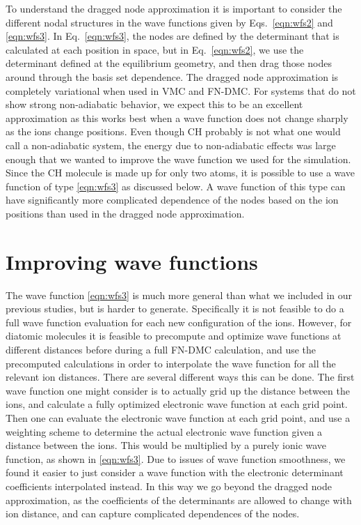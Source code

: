 \documentclass[aip,jcp,numerical,reprint]{revtex4-1}
\begin{document}
To understand the dragged node approximation  it is important to consider the different nodal structures in the wave functions given by Eqs.~\eqref{eqn:wfs2} and \eqref{eqn:wfs3}.  In Eq.~\eqref{eqn:wfs3}, the nodes are defined by the determinant that is calculated at each position in space, but in Eq.~\eqref{eqn:wfs2}, we use the determinant defined at the equilibrium geometry, and then drag those nodes around through the basis set dependence.   The dragged node approximation is completely variational when used in VMC and FN-DMC.  
For systems that do not show strong non-adiabatic behavior, we expect this to be an excellent approximation as this works best when a wave function does not change sharply as the ions change positions.   Even though CH probably is not what one would call a non-adiabatic system, the energy due to non-adiabatic effects was large enough that we wanted to improve the wave function we used for the simulation.    Since the CH molecule is made up for only two atoms, it is possible to use a wave function of type \eqref{eqn:wfs3} as discussed below.   A wave function of this type can have significantly more complicated dependence of the nodes based on the ion positions than used in the dragged node approximation.

\section{Improving wave functions}

The wave function \eqref{eqn:wfs3} is much more general than what we included in our previous studies, but is harder to generate.  Specifically it is not feasible to do a full wave function evaluation for each new configuration of the ions.  However, for diatomic molecules it is feasible to precompute and optimize wave functions at different distances before during a full FN-DMC calculation, and use the precomputed calculations in order to interpolate the wave function for all the relevant ion distances.  There are several different ways this can be done.   The first wave function one might consider is to actually grid up the distance between the ions, and calculate a fully optimized electronic wave function at each grid point.  Then one can evaluate the electronic wave function at each grid point, and use a weighting scheme to determine the actual electronic wave function given a distance between the ions.  This would be multiplied by a purely ionic wave function, as shown in \eqref{eqn:wfs3}.  Due to issues of wave function smoothness, we found it easier to just consider a wave function with the electronic determinant coefficients interpolated instead.  In this way we go beyond the dragged node approximation, as the coefficients of the determinants are allowed to change with ion distance, and can capture complicated dependences of the nodes.
\end{document}
